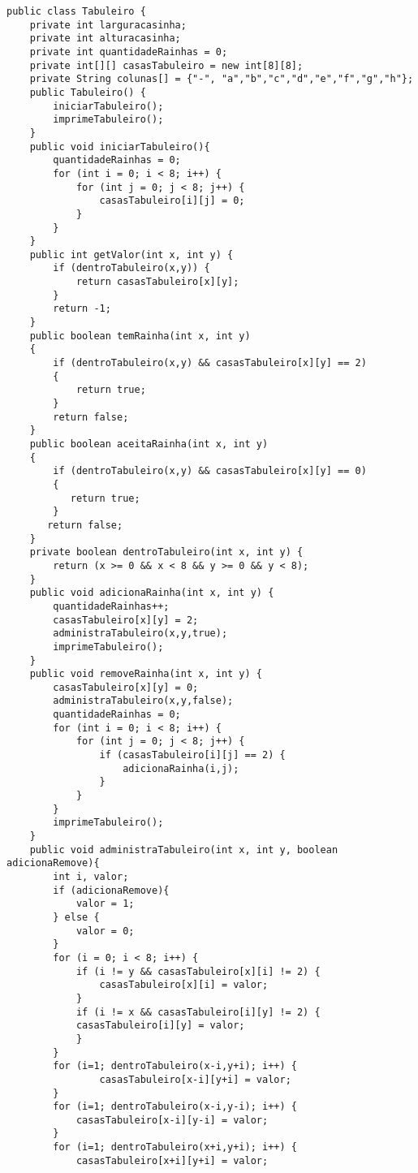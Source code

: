 \begin{lstlisting}
public class Tabuleiro {
    private int larguracasinha;
    private int alturacasinha;
    private int quantidadeRainhas = 0;
    private int[][] casasTabuleiro = new int[8][8];
    private String colunas[] = {"-", "a","b","c","d","e","f","g","h"};
    public Tabuleiro() {
        iniciarTabuleiro();   
        imprimeTabuleiro();
    }
    public void iniciarTabuleiro(){
        quantidadeRainhas = 0;
        for (int i = 0; i < 8; i++) {
            for (int j = 0; j < 8; j++) {
                casasTabuleiro[i][j] = 0;
            }
        }
    }
    public int getValor(int x, int y) {
        if (dentroTabuleiro(x,y)) {
            return casasTabuleiro[x][y];
        }
        return -1;
    }
    public boolean temRainha(int x, int y)
    {
        if (dentroTabuleiro(x,y) && casasTabuleiro[x][y] == 2)
        {
            return true;           
        }
        return false;
    }
    public boolean aceitaRainha(int x, int y)
    {
        if (dentroTabuleiro(x,y) && casasTabuleiro[x][y] == 0)
        {
           return true;
        }
       return false;
    }
    private boolean dentroTabuleiro(int x, int y) {
        return (x >= 0 && x < 8 && y >= 0 && y < 8);
    }
    public void adicionaRainha(int x, int y) {
        quantidadeRainhas++;
        casasTabuleiro[x][y] = 2;
        administraTabuleiro(x,y,true);     
        imprimeTabuleiro();
    }
    public void removeRainha(int x, int y) {
        casasTabuleiro[x][y] = 0;
        administraTabuleiro(x,y,false);
        quantidadeRainhas = 0; 
        for (int i = 0; i < 8; i++) {
            for (int j = 0; j < 8; j++) {
                if (casasTabuleiro[i][j] == 2) {
                    adicionaRainha(i,j);
                }
            }
        }
        imprimeTabuleiro();
    }
    public void administraTabuleiro(int x, int y, boolean adicionaRemove){
        int i, valor;
        if (adicionaRemove){
            valor = 1;
        } else {
            valor = 0;
        }
        for (i = 0; i < 8; i++) {
            if (i != y && casasTabuleiro[x][i] != 2) {
                casasTabuleiro[x][i] = valor;
            }
            if (i != x && casasTabuleiro[i][y] != 2) {    
            casasTabuleiro[i][y] = valor;
            }
        }
        for (i=1; dentroTabuleiro(x-i,y+i); i++) {
                casasTabuleiro[x-i][y+i] = valor;
        }
        for (i=1; dentroTabuleiro(x-i,y-i); i++) {
            casasTabuleiro[x-i][y-i] = valor;
        }
        for (i=1; dentroTabuleiro(x+i,y+i); i++) {
            casasTabuleiro[x+i][y+i] = valor;

\end{lstlisting}
